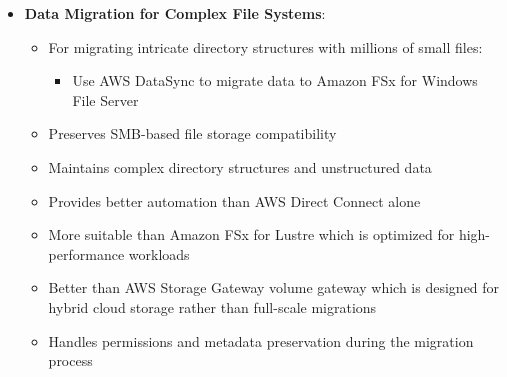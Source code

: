 \documentclass[11pt,a4paper]{report}
\begin{document}
\begin{itemize}
\begin{itemize}
\begin{itemize}
  \item Create DataSync locations for source and destination storage
  \item Configure tasks with transfer mode set to transfer only changed data
  \item Schedule tasks to run at appropriate intervals
\end{itemize}
  \item Provides automated data movement with minimal operational overhead
  \item Only copies changed files, optimizing transfer efficiency and reducing costs
  \item More efficient than Lambda functions mounting file systems or EC2-based solutions
  \item Includes automatic encryption and data integrity validation for secure transfers
  \item Supports AWS security mechanisms including IAM roles and VPC endpoints
  \item Can use a purpose-built network protocol and parallel, multi-threaded architecture
  \item Reduces operational costs with flat per-gigabyte pricing compared to custom scripts
\end{itemize}
  \item \textbf{Data Migration for Complex File Systems}:
\begin{itemize}
  \item For migrating intricate directory structures with millions of small files:
\begin{itemize}
  \item Use AWS DataSync to migrate data to Amazon FSx for Windows File Server
\end{itemize}
  \item Preserves SMB-based file storage compatibility
  \item Maintains complex directory structures and unstructured data
  \item Provides better automation than AWS Direct Connect alone
  \item More suitable than Amazon FSx for Lustre which is optimized for high-performance workloads
  \item Better than AWS Storage Gateway volume gateway which is designed for hybrid cloud storage rather than full-scale migrations
  \item Handles permissions and metadata preservation during the migration process

\end{itemize}
\end{itemize}
\end{document}
